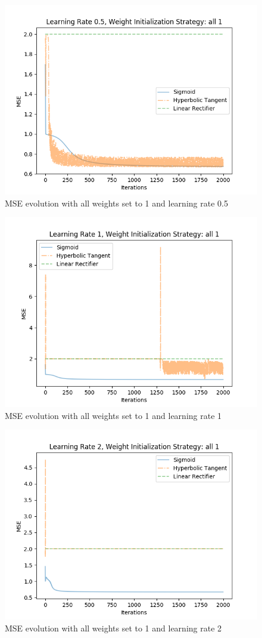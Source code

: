 \documentclass{article}
\begin{document}
\begin{figure}[H]
\centering
\includegraphics[width=0.9\linewidth]{img/mse_all1_05.png}
\caption{MSE evolution with all weights set to 1 and learning rate 0.5}
\label{fig:mse105}
\end{figure}
\begin{figure}[H]
\centering
\includegraphics[width=0.9\linewidth]{img/mse_all1_1.png}
\caption{MSE evolution with all weights set to 1 and learning rate 1}
\label{fig:mse11}
\end{figure}
\begin{figure}[H]
\centering
\includegraphics[width=0.9\linewidth]{img/mse_all1_2.png}
\caption{MSE evolution with all weights set to 1 and learning rate 2}
\label{fig:mse12}
\end{figure}
\end{document}
